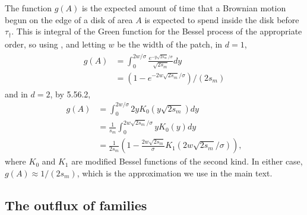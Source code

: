 \documentclass{article}
\newcommand{\citet}[1]{\cite{#1}}
\newcommand{\E}{\mathbb{E}}
\newcommand{\one}{\mathbf{1}}
\begin{document}
The function $g(A)$ is the expected amount of time that a Brownian motion begun on the edge of a disk of area $A$
is expected to spend inside the disk before $\tau_\dagger$.
This is integral of the Green function for the Bessel process of the appropriate order, 
so using \citet{borodin2002handbook}, %
and letting $w$ be the width of the patch,
in $d=1$,
\begin{align} \label{eqn:gA_1D}
  \begin{split}
    g(A) %
      &= \int_0^{2w/\sigma} \frac{ e^{- y \sqrt{2s_m}/\sigma }}{\sqrt{2s_m}} dy \\
      &= (1-e^{-2w\sqrt{2s_m}/\sigma})/(2s_m)
  \end{split}
\end{align}
and in $d=2$, by \citet{gradshteyn2007table} 5.56.2,
\begin{align}
    g(A) %
  &= \int_0^{2w/\sigma} 2 y K_0(y \sqrt{2s_m}) dy \\
  &= \frac{1}{s_m}\int_0^{2w\sqrt{2s_m}/\sigma} y K_0(y) dy \\
  &= \frac{1}{2s_m}\left(1- \frac{2w\sqrt{2s_m}}{\sigma} K_1(2w\sqrt{2s_m}/\sigma) \right)  ,
\end{align}
where $K_0$ and $K_1$ are modified Bessel functions of the second kind.
In either case, $g(A) \approx 1/(2s_m)$, which is the approximation we use in the main text.




\subsection[Outflux of Families]{The outflux of families}
\label{apx:outflux}
\end{document}
